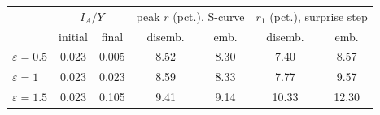 \begin{tabular}{lcccccc}\toprule
 & \multicolumn{2}{c}{$I_A/Y$} & \multicolumn{2}{c}{peak $r$ (pct.), S-curve} & \multicolumn{2}{c}{$r_1$ (pct.), surprise step}\\
 & initial & final & disemb. & emb. & disemb. & emb.\\\midrule
$\varepsilon=0.5$ & 0.023 & 0.005 & 8.52 & 8.30 & 7.40 & 8.57\\
$\varepsilon=1$ & 0.023 & 0.023 & 8.59 & 8.33 & 7.77 & 9.57\\
$\varepsilon=1.5$ & 0.023 & 0.105 & 9.41 & 9.14 & 10.33 & 12.30\\
\bottomrule\end{tabular}
